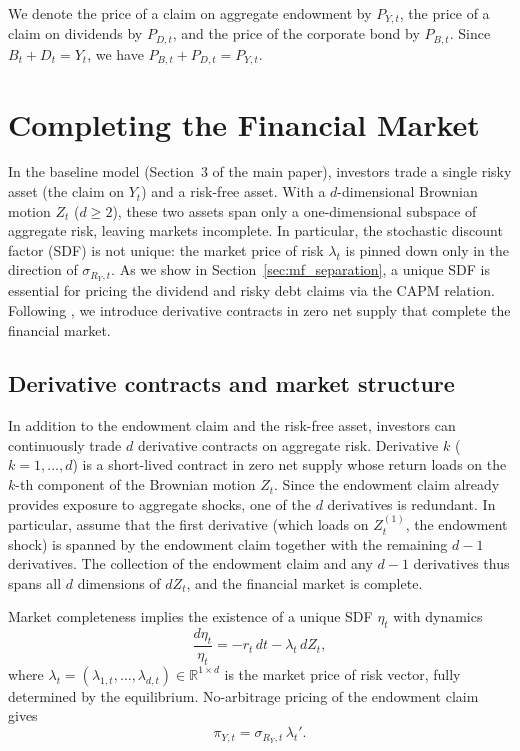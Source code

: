 \documentclass[11pt,english]{article}
\begin{document}
We denote the price of a claim on aggregate endowment by $P_{Y,t}$, the price of a claim on dividends by $P_{D,t}$, and the price of the corporate bond by $P_{B,t}$.
Since $B_t+D_t = Y_t$, we have $P_{B,t} +P_{D,t}= P_{Y,t}$.

\section{Completing the Financial Market}\label{sec:market_completion}

In the baseline model (Section~3 of the main paper), investors trade a single risky asset (the claim on $Y_t$) and a risk-free asset. With a $d$-dimensional Brownian motion $Z_t$ ($d\ge 2$), these two assets span only a one-dimensional subspace of aggregate risk, leaving markets incomplete. In particular, the stochastic discount factor (SDF) is not unique: the market price of risk $\lambda_t$ is pinned down only in the direction of $\sigma_{R_Y,t}$. As we show in Section~\ref{sec:mf_separation}, a unique SDF is essential for pricing the dividend and risky debt claims via the CAPM relation. Following \citet{DiTella2017}, we introduce derivative contracts in zero net supply that complete the financial market.

\subsection{Derivative contracts and market structure}

In addition to the endowment claim and the risk-free asset, investors can continuously trade $d$ derivative contracts on aggregate risk. Derivative $k$ ($k=1,\ldots,d$) is a short-lived contract in zero net supply whose return loads on the $k$-th component of the Brownian motion $Z_t$. Since the endowment claim already provides exposure to aggregate shocks, one of the $d$ derivatives is redundant. In particular, assume that the first derivative (which loads on $Z_t^{(1)}$, the endowment shock) is spanned by the endowment claim together with the remaining $d-1$ derivatives. The collection of the endowment claim and any $d-1$ derivatives thus spans all $d$ dimensions of $dZ_t$, and the financial market is complete.

Market completeness implies the existence of a unique SDF $\eta_t$ with dynamics
\begin{equation}\label{eq:SDF_complete}
    \frac{d\eta_t}{\eta_t} = -r_t\,dt - \lambda_t\,dZ_t,
\end{equation}
where $\lambda_t=(\lambda_{1,t},\ldots,\lambda_{d,t})\in\mathbb{R}^{1\times d}$ is the market price of risk vector, fully determined by the equilibrium. No-arbitrage pricing of the endowment claim gives
\begin{equation}\label{eq:no_arb_Y}
    \pi_{Y,t} = \sigma_{R_Y,t}\,\lambda_t'.
\end{equation}
\end{document}
